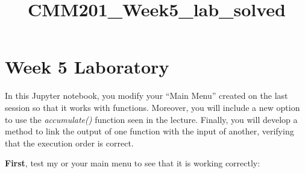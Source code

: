 \documentclass[11pt]{article}
\title{CMM201\_Week5\_lab\_solved}
\begin{document}
    
    
    \maketitle
    
    

    
    \hypertarget{week-5-laboratory}{%
\section{Week 5 Laboratory}\label{week-5-laboratory}}

In this Jupyter notebook, you modify your ``Main Menu'' created on the
last session so that it works with functions. Moreover, you will include
a new option to use the \emph{accumulate()} function seen in the
lecture. Finally, you will develop a method to link the output of one
function with the input of another, verifying that the execution order
is correct.

    \textbf{First}, test my or your main menu to see that it is working
correctly:
\end{document}
